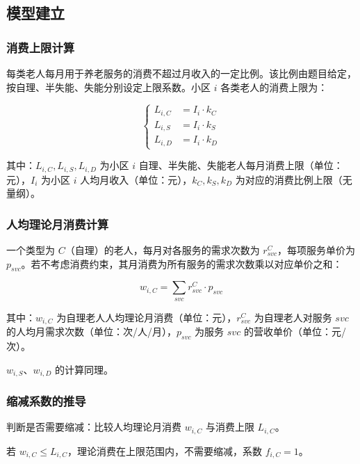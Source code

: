 \documentclass[12pt,a4paper]{article}
\begin{document}
\subsection{模型建立}

\subsubsection{消费上限计算}

每类老人每月用于养老服务的消费不超过月收入的一定比例。该比例由题目给定，按自理、半失能、失能分别设定上限系数。小区 $i$ 各类老人的消费上限为：

\begin{equation}
\left\{
\begin{aligned}
L_{i,C} &= I_i \cdot k_C \\
L_{i,S} &= I_i \cdot k_S \\
L_{i,D} &= I_i \cdot k_D
\end{aligned}
\right.
\tag{3.1}
\end{equation}

其中：$L_{i,C}, L_{i,S}, L_{i,D}$ 为小区 $i$ 自理、半失能、失能老人每月消费上限（单位：元），$I_i$ 为小区 $i$ 人均月收入（单位：元），$k_C, k_S, k_D$ 为对应的消费比例上限（无量纲）。

\subsubsection{人均理论月消费计算}

一个类型为 $C$（自理）的老人，每月对各服务的需求次数为 $r_{svc}^C$，每项服务单价为 $p_{svc}$。若不考虑消费约束，其月消费为所有服务的需求次数乘以对应单价之和：

\begin{equation}
w_{i,C} = \sum_{svc} r_{svc}^C \cdot p_{svc}
\tag{3.2}
\end{equation}

其中：$w_{i,C}$ 为自理老人人均理论月消费（单位：元），$r_{svc}^C$ 为自理老人对服务 $svc$ 的人均月需求次数（单位：次/人/月），$p_{svc}$ 为服务 $svc$ 的营收单价（单位：元/次）。

$w_{i,S}$、$w_{i,D}$ 的计算同理。

\subsubsection{缩减系数的推导}

判断是否需要缩减：比较人均理论月消费 $w_{i,C}$ 与消费上限 $L_{i,C}$。

若 $w_{i,C} \leq L_{i,C}$，理论消费在上限范围内，不需要缩减，系数 $f_{i,C}=1$。
\end{document}
